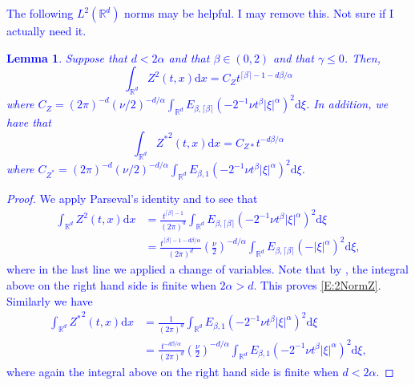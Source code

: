 \documentclass[a4paper,11pt]{article}
\numberwithin{equation}{section}
\theoremstyle{plain}
\newtheorem{lemma}[theorem]{Lemma}
\theoremstyle{definition}
\newcommand{\ud}{\ensuremath{\mathrm{d} }}
\newcommand{\R}{\mathbb{R}}
\numberwithin{NQ}{section}
\numberwithin{LQ}{section}
\numberwithin{ZQ}{section}
\begin{document}
	\textcolor{blue}{
		The following $L^2(\R^d)$ norms may be helpful. I may remove this. Not sure if I actually need it.
		\begin{lemma}
			\label{L:2NormZandZ*}
			Suppose that $d < 2 \alpha$ and that $\beta \in (0,2)$ and that $\gamma \le 0$. Then,
			\begin{equation}
			\label{E:2NormZ}
			\int_{\R^d} Z^2(t,x) \ud x = C_{Z} t^{\lceil \beta \rceil -1 - d\beta / \alpha}
			\end{equation}		
			where $C_{Z} = (2\pi)^{-d}(\nu/2)^{-d/\alpha}\int_{\R^d} E_{\beta,\lceil \beta \rceil}\left( -2^{-1}\nu t^\beta |\xi|^\alpha \right)^2 \ud \xi$. In addition, we have that
			\begin{equation}
			\label{E:2NormZ*}
			\int_{\R^d} {Z^*}^2(t,x) \ud x = C_{Z*} t^{-d\beta / \alpha}
			\end{equation}		
			where $C_{Z^*} = (2\pi)^{-d} (\nu/2)^{-d/\alpha} \int_{\R^d} E_{\beta,1}\left( -2^{-1}\nu t^\beta |\xi|^\alpha \right)^2 \ud \xi$.
		\end{lemma}
		\begin{proof}
			We apply Parseval's identity and \cite[Theorem 4.1]{CHN19} to see that 
			\begin{align*}
			\int_{\R^d} Z^2(t,x) \ud x &= \frac{t^{\lceil \beta \rceil -1}}{(2\pi)^d} \int_{\R^d} E_{\beta,\lceil \beta \rceil}\left( -2^{-1}\nu t^\beta |\xi|^\alpha \right)^2 \ud \xi \\
			&= \frac{t^{\lceil \beta \rceil -1 - d\beta / \alpha}}{(2\pi)^d} \left( \frac{\nu}{2} \right)^{-d/\alpha} \int_{\R^d} E_{\beta,\lceil \beta \rceil}\left( -|\xi|^\alpha \right)^2 \ud \xi,
			\end{align*}
			where in the last line we applied a change of variables. Note that by \cite[Theorem 1.6]{Podlubny99}, the integral above on the right hand side is finite when $2\alpha >d$. This proves \eqref{E:2NormZ}. Similarly we have 
			\begin{align*}
			\int_{\R^d} {Z^*}^2(t,x) \ud x &= \frac{1}{(2\pi)^d} \int_{\R^d} E_{\beta,1}\left( -2^{-1}\nu t^\beta |\xi|^\alpha \right)^2 \ud \xi \\
			&= \frac{t^{-d\beta /\alpha}}{(2\pi)^d} \left(\frac{\nu}{2}\right)^{-d/\alpha} \int_{\R^d} E_{\beta,1}\left( -2^{-1}\nu t^\beta |\xi|^\alpha \right)^2 \ud \xi,
			\end{align*}
			where again the integral above on the right hand side is finite when $d < 2\alpha$.
		\end{proof}
	}
	
\end{document}
